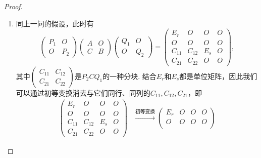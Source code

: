 \begin{enumerate}
\begin{proof}
\begin{enumerate}
                  \item 同上一问的假设，此时有
                        \[
                            \begin{pmatrix}
                                P_1 & O \\ O & P_2
                            \end{pmatrix}
                            \begin{pmatrix}
                                A & O \\ C & B
                            \end{pmatrix}
                            \begin{pmatrix}
                                Q_1 & O \\ O & Q_2
                            \end{pmatrix}
                             =\begin{pmatrix}
                                    E_r & O & O & O \\ O & O & O & O \\ C_{11} & C_{12} & E_s & O \\ C_{21} & C_{22} & O & O
                                \end{pmatrix},
                        \]
                        其中$\begin{pmatrix}
                                C_{11} & C_{12} \\ C_{21} & C_{22}
                            \end{pmatrix}$是$P_2CQ_1$的一种分块. 结合$E_r$和$E_s$都是单位矩阵，因此我们可以通过初等变换消去与它们同行、同列的$C_{11},C_{12},C_{21}$，即
                        \begin{align*}
                            \begin{pmatrix}
                                E_r    & O      & O   & O \\
                                O      & O      & O   & O \\
                                C_{11} & C_{12} & E_s & O \\
                                C_{21} & C_{22} & O   & O
                            \end{pmatrix}
                             & \xrightarrow{\text{初等变换}}\begin{pmatrix}
                                                                E_r & O      & O   & O \\
                                                                O   & O      & O   & O \\

\end{pmatrix}
\end{align*}
\end{enumerate}
\end{proof}
\end{enumerate}
